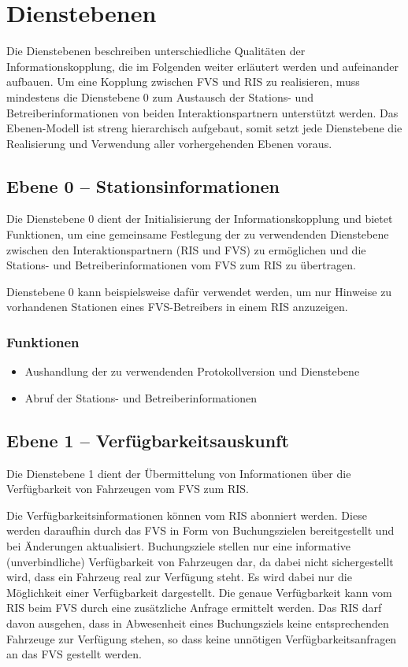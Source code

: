 \chapter{Dienstebenen}
\label{sec:Dienstebenen}
Die Dienstebenen beschreiben unterschiedliche Qualitäten der Informationskopplung, die im Folgenden weiter erläutert werden und aufeinander aufbauen. Um eine Kopplung zwischen FVS und RIS zu realisieren, muss mindestens die Dienstebene 0 zum Austausch der Stations- und Betreiberinformationen von beiden Interaktionspartnern unterstützt werden. Das Ebenen-Modell ist streng hierarchisch aufgebaut, somit setzt jede Dienstebene die Realisierung und Verwendung aller vorhergehenden Ebenen voraus.
 
\section{Ebene 0 -- Stationsinformationen}
Die Dienstebene 0 dient der Initialisierung der Informationskopplung und bietet Funktionen, um eine gemeinsame Festlegung der zu verwendenden Dienstebene zwischen den Interaktionspartnern (RIS und FVS) zu ermöglichen und die Stations- und Betreiberinformationen vom FVS zum RIS zu übertragen. 

Dienstebene 0 kann beispielsweise dafür verwendet werden, um nur Hinweise zu vorhandenen Stationen eines FVS-Betreibers in einem RIS anzuzeigen.
\subsection*{Funktionen}
\begin{itemize}
\item Aushandlung der zu verwendenden Protokollversion und Dienstebene
\item Abruf der Stations- und Betreiberinformationen
\end{itemize}

\section{Ebene 1 -- Verfügbarkeitsauskunft}
Die Dienstebene 1 dient der Übermittelung von Informationen über die Verfügbarkeit von Fahrzeugen vom FVS zum RIS.

Die Verfügbarkeitsinformationen können vom RIS abonniert werden. Diese werden daraufhin durch das FVS in Form von Buchungszielen bereitgestellt und bei Änderungen aktualisiert. Buchungsziele stellen nur eine informative (unverbindliche) Verfügbarkeit von Fahrzeugen dar, da dabei nicht sichergestellt wird, dass ein Fahrzeug real zur Verfügung steht. Es wird dabei nur die Möglichkeit einer Verfügbarkeit dargestellt. Die genaue Verfügbarkeit kann vom RIS beim FVS durch eine zusätzliche Anfrage ermittelt werden. Das RIS darf davon ausgehen, dass in Abwesenheit eines Buchungsziels keine entsprechenden Fahrzeuge zur Verfügung stehen, so dass keine unnötigen Verfügbarkeitsanfragen an das FVS gestellt werden.

